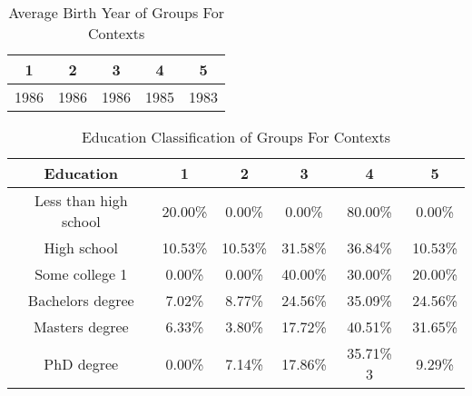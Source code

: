 \begin{table}[h!]
  \centering
  \caption{Average Birth Year of Groups For Contexts}
  \label{tab:year_c}
  \begin{tabular}{ccccc}
    \toprule
     1&2&3&4&5\\
    \midrule
	1986& 1986& 1986& 1985& 1983\\
    \bottomrule
  \end{tabular}
\end{table}


\begin{table}[h!]
  \centering
  \caption{Education Classification of Groups For Contexts}
  \label{tab:edu_c}
  \begin{tabular}{cccccc}
    \toprule
     Education&1&2&3&4&5\\
    \midrule
    
Less than high school	&20.00\%	&0.00\%	&0.00\%	&80.00\%	&0.00\%\\
High school	&10.53\%	&10.53\%	&31.58\%	&36.84\%	&10.53\%\\
Some college	1&0.00\%	&0.00\%	&40.00\%	&30.00\%	&20.00\%\\
Bachelors degree	&7.02\%	&8.77\%	&24.56\%	&35.09\%	&24.56\%\\
Masters degree	&6.33\%	&3.80\%	&17.72\%	&40.51\%	&31.65\%\\
PhD degree	&0.00\%	&7.14\%	&17.86\%	&35.71\%	3&9.29\%\\
    \bottomrule
  \end{tabular}
\end{table} 





